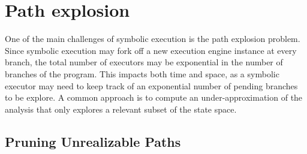 
\section{Path explosion}
\label{se:path-explosion}

One of the main challenges of symbolic execution is the path explosion problem. Since symbolic execution may fork off a new execution engine instance at every branch, the total number of executors may be exponential in the number of branches of the program. This impacts both time and space, as a symbolic executor may need to keep track of an exponential number of pending branches to be explore. A common approach is to compute an under-approximation of the analysis that only explores a relevant subset of the state space.

\subsection{Pruning Unrealizable Paths}
\label{ss:unrealizable-paths}

